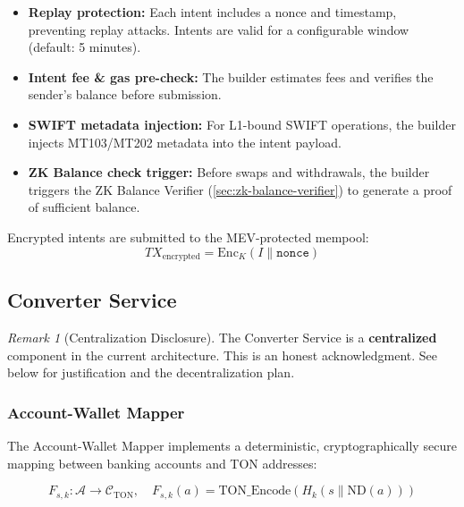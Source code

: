 \documentclass[12pt,a4paper]{article}
\theoremstyle{definition}
\theoremstyle{remark}
\newtheorem{remark}{Remark}[section]
\begin{document}
\begin{itemize}[nosep]
    \item \textbf{Replay protection:} Each intent includes a nonce and timestamp, preventing replay attacks. Intents are valid for a configurable window (default: 5 minutes).
    \item \textbf{Intent fee \& gas pre-check:} The builder estimates fees and verifies the sender's balance before submission.
    \item \textbf{SWIFT metadata injection:} For L1-bound SWIFT operations, the builder injects MT103/MT202 metadata into the intent payload.
    \item \textbf{ZK Balance check trigger:} Before swaps and withdrawals, the builder triggers the ZK Balance Verifier (\cref{sec:zk-balance-verifier}) to generate a proof of sufficient balance.
\end{itemize}

Encrypted intents are submitted to the MEV-protected mempool:
\begin{equation}
TX_{\text{encrypted}} = \text{Enc}_K(I \| \texttt{nonce})
\end{equation}

\subsection{Converter Service}
\label{sec:converter-service}

\begin{remark}[Centralization Disclosure]
The Converter Service is a \textbf{centralized} component in the current architecture. This is an honest acknowledgment. See below for justification and the decentralization plan.
\end{remark}

\subsubsection{Account-Wallet Mapper}

The Account-Wallet Mapper implements a deterministic, cryptographically secure mapping between banking accounts and TON addresses:

\begin{equation}
\label{eq:account-mapper}
F_{s,k} : \mathcal{A} \to \mathcal{C}_{\text{TON}}, \quad F_{s,k}(a) = \text{TON\_Encode}(H_k(s \| \text{ND}(a)))
\end{equation}
\end{document}
